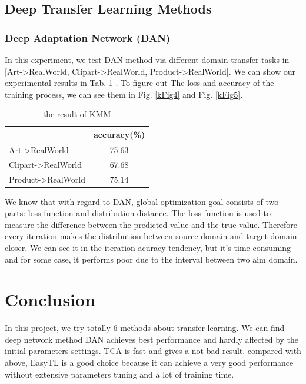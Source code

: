 \documentclass[conference]{IEEEtran}
\begin{document}
\subsection{Deep Transfer Learning Methods}

\subsubsection{Deep Adaptation Network (DAN)}

In this experiment, we test DAN method via different domain transfer tasks in [Art->RealWorld, Clipart->RealWorld, Product->RealWorld]. We can show our experimental results in Tab. \ref{tab9} . To figure out The loss and accuracy of the training process, we can see them in Fig. \ref{kFig4} and Fig. \ref{kFig5}. 

\begin{table}[H]
	\centering
	\caption{the result of KMM}
	\begin{tabular}{|l|c|}
		\hline
		\diagbox{dataset}{result} & accuracy(\%) \\
		\hline
		Art->RealWorld & 75.63\\
		\hline
		Clipart->RealWorld & 67.68 \\
		\hline
		Product->RealWorld & 75.14 \\
		\hline
	\end{tabular}\label{tab9}
\end{table}

We know that with regard to DAN, global optimization goal consists of two parts: loss function and distribution distance. The loss function is used to measure the difference between the predicted value and the true value. Therefore every iteration makes the distribution between source domain and target domain closer. We can see it in the iteration acuracy tendency, but it's time-consuming and for some case, it performs poor due to the interval between two aim domain.


\section{Conclusion}
In this project, we try totally 6 methods about transfer learning. We can find deep network method DAN achieves best performance and hardly affected by the initial parameters settings. TCA is fast and gives a not bad result. compared with above, EasyTL is a good choice because it can achieve a very good performance without extensive parameters tuning and a lot of training time.


\end{document}
